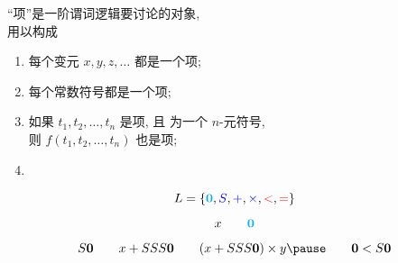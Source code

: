 \begin{frame}{}
  \begin{center}
    ``项''是一阶谓词逻辑要讨论的对象, \\
    用以构成 
  \end{center}

  \pause
  \begin{definition}[项 (Term)]
    \begin{enumerate}[(1)]
      \setlength{\itemsep}{8pt}
      \item 每个变元 $x, y, z, \dots$ 都是一个项;
      \item 每个常数符号都是一个项;
      \item 如果 $t_{1}, t_{2}, \dots, t_{n}$ 是项,
        且  为一个 $n$-元符号, \\
        则 $f(t_{1}, t_{2}, \dots, t_{n})$ 也是项;
      \item {}
    \end{enumerate}
  \end{definition}
  \[
    L = \{\textbf{\textcolor{cyan}{0}}, \textcolor{blue}{S}, \textcolor{blue}{+}, \textcolor{blue}{\times}, \textcolor{red}{<}, \textcolor{red}{=}\}
  \]
  \[
    x \qquad \textcolor{cyan}{\bf 0}
  \]
  \[
    S{\bf 0} \qquad x + SSS{\bf 0} \qquad (x + SSS{\bf 0}) \times y
    \pause \qquad {\bf 0} < S{\bf 0}
  \]
\end{frame}

